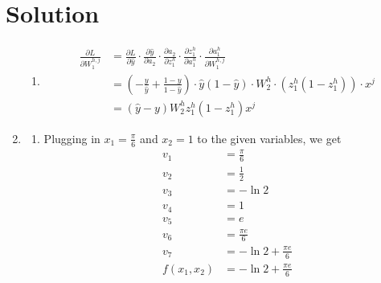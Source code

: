 \documentclass[submit]{../harvardml}
\newenvironment{answer}
  {\section*{Solution}}
{}
\begin{document}
\begin{answer}
\begin{enumerate}
\begin{enumerate}
            \item
                  \begin{align*}
                    \frac{\partial L}{\partial W_1^{h,j}} 
                    &= \frac{\partial L}{\partial \hat{y}} \cdot \frac{\partial \hat{y}}{\partial a_2} \cdot \frac{\partial a_2}{\partial z_1^h} \cdot \frac{\partial z_1^h}{\partial a_1^h} \cdot \frac{\partial a_1^h}{\partial W_1^{h,j}} \\
                    &= \left(-\frac{y}{\hat{y}} + \frac{1-y}{1-\hat{y}}\right)
                    \cdot \hat{y}(1-\hat{y}) \cdot W_2^h \cdot \left(z_1^h(1-z_1^h)\right) \cdot x^j \\
                    &= (\hat{y}-y) W_2^h z_1^h (1-z_1^h) x^j
                  \end{align*}
          \end{enumerate}

    \item

          \begin{enumerate}
            \item Plugging in $x_1 = \frac{\pi}{6}$ and $x_2 = 1$ to the given variables, we get
                  \begin{align*}
                    v_1        & = \frac{\pi}{6}\\
                    v_2        & = \frac{1}{2}\\
                    v_3        & = -\ln 2\\
                    v_4        & = 1\\
                    v_5        & = e\\
                    v_6        & = \frac{\pi e}{6}\\
                    v_7        & = -\ln2 + \frac{\pi e}{6}\\
                    f(x_1,x_2) & = -\ln 2 + \frac{\pi e}{6}\\
                  \end{align*}


\end{enumerate}
\end{enumerate}
\end{answer}
\end{document}

